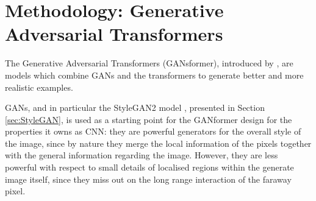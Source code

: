 \documentclass{article}
\begin{document}
%
%
%

\section{Methodology: Generative Adversarial Transformers}\label{sec:ganformer}

The Generative Adversarial Transformers (GANsformer), introduced by 
\citet{hudson2021generative}, are models which combine GANs and the transformers to 
generate 
better and more realistic examples.

GANs, and in particular the StyleGAN2 model \cite{karras2020analyzing}, presented in Section 
\ref{sec:StyleGAN}, %
is used as a starting point for the 
GANformer design for the properties it owns as CNN: they are powerful generators for the overall 
style of the image, since by nature they merge the local information of the pixels together with the 
general information regarding the image. 
However, they are less powerful with respect to small details of localised regions within the 
generate 
image itself, since they miss out on the long range interaction of the faraway pixel.
\end{document}
